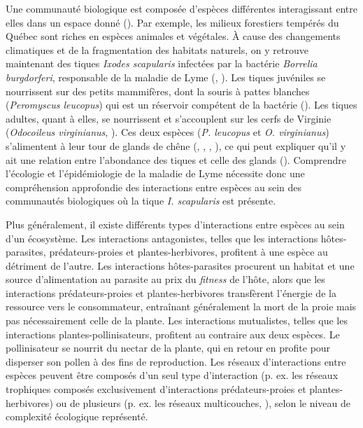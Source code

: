 Une communauté biologique est composée d'espèces différentes interagissant entre
elles dans un espace donné (\cite{Stroud2015Community}). Par exemple, les
milieux forestiers tempérés du Québec sont riches en espèces animales et
végétales. À cause des changements climatiques et de la fragmentation des
habitats naturels, on y retrouve maintenant des tiques \textit{Ixodes
scapularis} infectées par la bactérie \textit{Borrelia burgdorferi}, responsable
de la maladie de Lyme (\cite{Ogden2009Emergence}, \cite{Simon2014Climate}). Les
tiques juvéniles se nourrissent sur des petits mammifères, dont la souris à
pattes blanches (\textit{Peromyscus leucopus}) qui est un réservoir compétent de
la bactérie (\cite{Donahue1987Reservoir}). Les tiques adultes, quant à elles, se
nourrissent et s'accouplent sur les cerfs de Virginie (\textit{Odocoileus
virginianus}, \cite{Lane1991Lyme}). Ces deux espèces (\textit{P. leucopus} et
\textit{O. virginianus}) s'alimentent à leur tour de glands de chêne
(\cite{McShea1993Variablea}, \cite{Elkinton1996Interactions},
\cite{Wolff1996Population}, \cite{McShea2000Influence}), ce qui peut expliquer
qu'il y ait une relation entre l'abondance des tiques et celle des glands
(\cite{Ostfeld2006Climate}). Comprendre l'écologie et l'épidémiologie de la
maladie de Lyme nécessite donc une compréhension approfondie des interactions
entre espèces au sein des communautés biologiques où la tique \textit{I.
scapularis} est présente.

Plus généralement, il existe différents types d'interactions entre espèces au
sein d'un écosystème. Les interactions antagonistes, telles que les interactions
hôtes-parasites, prédateurs-proies et plantes-herbivores, profitent à une espèce
au détriment de l'autre. Les interactions hôtes-parasites procurent un habitat
et une source d'alimentation au parasite au prix du \textit{fitness} de l'hôte,
alors que les interactions prédateurs-proies et plantes-herbivores transfèrent
l'énergie de la ressource vers le consommateur, entraînant généralement la mort
de la proie mais pas nécessairement celle de la plante. Les interactions
mutualistes, telles que les interactions plantes-pollinisateurs, profitent au
contraire aux deux espèces. Le pollinisateur se nourrit du nectar de la plante,
qui en retour en profite pour disperser son pollen à des fins de reproduction.
Les réseaux d'interactions entre espèces peuvent être composés d'un seul type
d'interaction (p. ex. les réseaux trophiques composés exclusivement
d'interactions prédateurs-proies et plantes-herbivores) ou de plusieurs (p. ex.
les réseaux multicouches, \cite{Pilosof2017Multilayer}), selon le niveau de
complexité écologique représenté.

